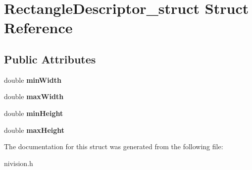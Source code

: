 \hypertarget{structRectangleDescriptor__struct}{
\section{RectangleDescriptor\_\-struct Struct Reference}
\label{structRectangleDescriptor__struct}
}
\subsection*{Public Attributes}
\begin{DoxyCompactItemize}
\item 
\hypertarget{structRectangleDescriptor__struct_af4e1ed6e3a5b57fbb7bd56dca6f3c051}{
double {\bfseries minWidth}}
\label{structRectangleDescriptor__struct_af4e1ed6e3a5b57fbb7bd56dca6f3c051}

\item 
\hypertarget{structRectangleDescriptor__struct_a1a7bad876dd5731233ccef86f479f625}{
double {\bfseries maxWidth}}
\label{structRectangleDescriptor__struct_a1a7bad876dd5731233ccef86f479f625}

\item 
\hypertarget{structRectangleDescriptor__struct_a9c174b782c3fc8020f2576f2f14be18b}{
double {\bfseries minHeight}}
\label{structRectangleDescriptor__struct_a9c174b782c3fc8020f2576f2f14be18b}

\item 
\hypertarget{structRectangleDescriptor__struct_abf7e93568b6c09d63c2271fd54b81322}{
double {\bfseries maxHeight}}
\label{structRectangleDescriptor__struct_abf7e93568b6c09d63c2271fd54b81322}

\end{DoxyCompactItemize}


The documentation for this struct was generated from the following file:\begin{DoxyCompactItemize}
\item 
nivision.h\end{DoxyCompactItemize}
